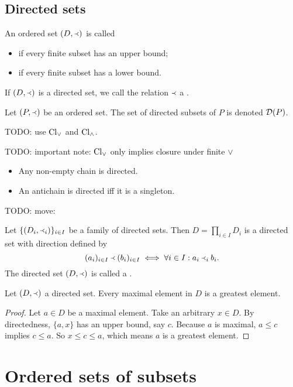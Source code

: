 \subsection{Directed sets}
\begin{definition}
An ordered set $\left( D,\Yleft \right)$ is called
\begin{itemize}
\item {} if every finite subset has an upper bound;
\item {} if every finite subset has a lower bound.
\end{itemize}
If $(D,\Yleft)$ is a directed set, we call the relation $\Yleft$ a .

Let $\left( P,\Yleft \right)$ be an ordered set. The set of directed subsets of $P$ is denoted $\operatorname{\mathcal{D}}(P)$.
\end{definition}
TODO: use $\operatorname{Cl}_\vee$ and $\operatorname{Cl}_\wedge$.

TODO: important note: $\operatorname{Cl}_\vee$ only implies closure under finite $\vee$

\begin{example}
\begin{itemize}
\item Any non-empty chain is directed.
\item An antichain is directed iff it is a singleton.
\end{itemize}
\end{example}

TODO: move:
\begin{proposition}
Let $\{(D_i,\Yleft_i)\}_{i\in I}$ be a family of directed sets. Then $D= \prod_{i\in I}D_i$ is a directed set with direction defined by
\[ (a_i)_{i\in I} \Yleft (b_i)_{i\in I} \iff \forall i\in I: a_i\Yleft_i b_i. \]
The directed set $(D,\Yleft)$ is called a .
\end{proposition}

\begin{proposition}
Let $\left( D, \Yleft \right)$ a directed set. Every maximal element in $D$ is a greatest element.
\end{proposition}
\begin{proof}
Let $a\in D$ be a maximal element. Take an arbitrary $x\in D$. By directedness, $\{a,x\}$ has an upper bound, say $c$. Because $a$ is maximal, $a\leq c$ implies $c\leq a$. So $x\leq c\leq a$, which means $a$ is a greatest element.
\end{proof}

\section{Ordered sets of subsets}
